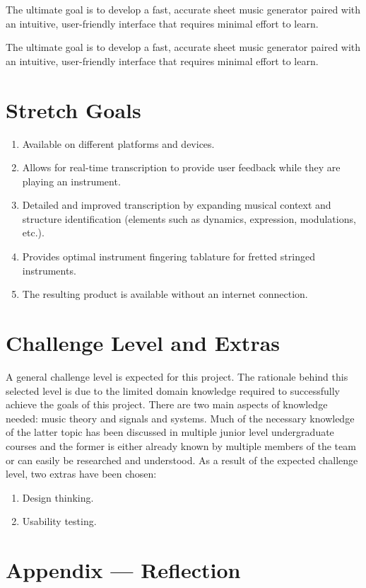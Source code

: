 \documentclass{article}
\begin{document}
The ultimate goal is to develop a fast, accurate sheet music generator paired with an intuitive, user-friendly interface that requires minimal effort to learn.

The ultimate goal is to develop a fast, accurate sheet music generator paired with an intuitive, user-friendly interface that requires minimal effort to learn.

\section{Stretch Goals}
\begin{enumerate}
    \item Available on different platforms and devices.
    \item Allows for real-time transcription to provide user feedback while they are playing an
    instrument.
    \item Detailed and improved transcription by expanding musical context and
    structure identification (elements such as dynamics, expression, modulations, etc.).
    \item Provides optimal instrument fingering tablature for fretted stringed instruments.
    \item The resulting product is available without an internet connection.
\end{enumerate}

\section{Challenge Level and Extras}
A general challenge level is expected for this project. The rationale behind this selected level is due to
the limited domain knowledge required to successfully achieve the goals of this project. There are two main 
aspects of knowledge needed: music theory and signals and systems. Much of the necessary knowledge of the 
latter topic has been discussed in multiple junior level undergraduate courses and the former is either already
known by multiple members of the team or can easily be researched and understood.
As a result of the expected challenge level, two extras have been chosen:
\begin{enumerate}
    \item Design thinking.
    \item Usability testing.
\end{enumerate}

\newpage{}

\section*{Appendix --- Reflection}
\end{document}
